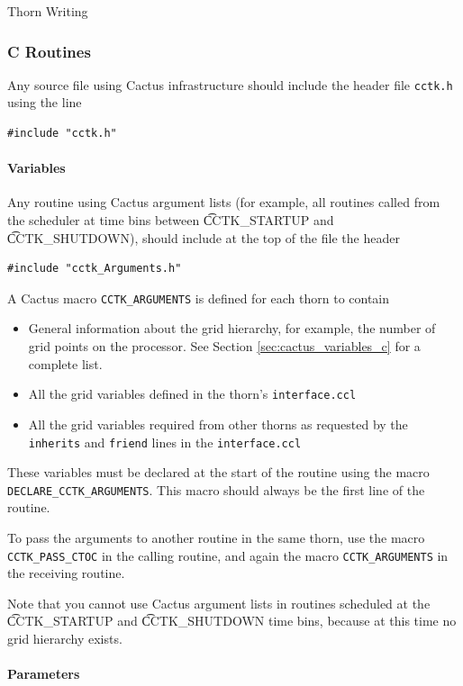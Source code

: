 \begin{cactuspart}{Thorn Writing}
\subsubsection{C Routines}

Any source file using Cactus infrastructure should include
the header file \texttt{cctk.h} using the line
\begin{verbatim}
#include "cctk.h"
\end{verbatim}

\paragraph{Variables}

Any routine using Cactus argument lists (for example, all routines called from
the scheduler at time bins between {\t CCTK\_STARTUP} and {\t CCTK\_SHUTDOWN}),
should include at the top of the file the header
\begin{verbatim}
#include "cctk_Arguments.h"
\end{verbatim}

A Cactus macro \texttt{CCTK\_ARGUMENTS} is defined for each thorn
to contain
\begin{itemize}
\item General information about the grid hierarchy, for example, the
number of grid points on the processor. See Section \ref{sec:cactus_variables_c}
for a complete list.
\item All the grid variables defined in the thorn's \texttt{interface.ccl}
\item All the grid variables required from other thorns as requested by
      the \texttt{inherits} and \texttt{friend} lines in the \texttt{interface.ccl}
\end{itemize}
These variables must be declared at the start of the routine using
the macro \texttt{DECLARE\_CCTK\_ARGUMENTS}. This macro should always be the
first line of the routine.

To pass the arguments to another routine in the same thorn, use the macro
\texttt{CCTK\_PASS\_CTOC} in the calling routine, and again the macro
\texttt{CCTK\_ARGUMENTS} in the receiving routine.

Note that you cannot use Cactus argument lists in routines scheduled at the
{\t CCTK\_STARTUP} and {\t CCTK\_SHUTDOWN} time bins, because at this time
no grid hierarchy exists.


\paragraph{Parameters}


\end{cactuspart}
